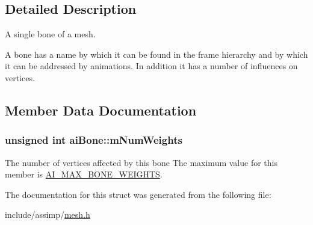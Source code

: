 \subsection{\-Detailed \-Description}
\-A single bone of a mesh. 

\-A bone has a name by which it can be found in the frame hierarchy and by which it can be addressed by animations. \-In addition it has a number of influences on vertices. 

\subsection{\-Member \-Data \-Documentation}
\hypertarget{structaiBone_a87a79d42a0132753aac66397ad6f9b71}{
\subsubsection[{m\-Num\-Weights}]{\setlength{\rightskip}{0pt plus 5cm}unsigned int {\bf ai\-Bone\-::m\-Num\-Weights}}}\label{structaiBone_a87a79d42a0132753aac66397ad6f9b71}
\-The number of vertices affected by this bone \-The maximum value for this member is \hyperlink{mesh_8h_a565e88bbf36ef4957f1229609e51b7f6}{\-A\-I\-\_\-\-M\-A\-X\-\_\-\-B\-O\-N\-E\-\_\-\-W\-E\-I\-G\-H\-T\-S}. 

\-The documentation for this struct was generated from the following file\-:\begin{DoxyCompactItemize}
\item 
include/assimp/\hyperlink{mesh_8h}{mesh.\-h}\end{DoxyCompactItemize}
